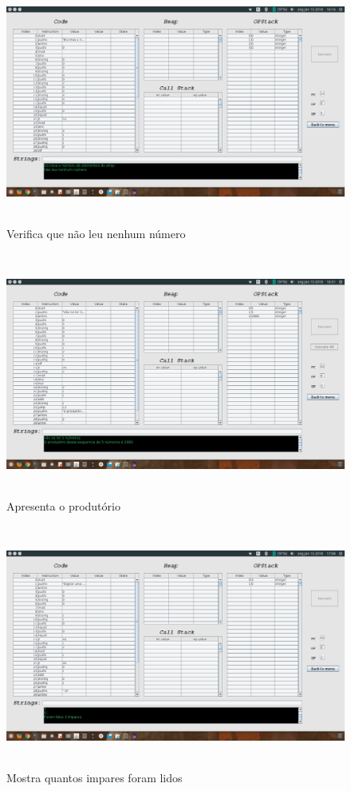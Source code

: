 \documentclass{report}
\begin{document}
\begin{figure}[h]
	\centering
	\includegraphics[width=14cm,height= 8cm]{exemplo2-2.png}
	\caption{Verifica que não leu nenhum número}
	\label{Exemplo 2.2}
\end{figure}

\begin{figure}[h]
	\centering
	\includegraphics[width=14cm,height= 8cm]{exemplo3-1.png}
	\caption{Apresenta o produtório}
	\label{Exemplo 3.1}
\end{figure}

\begin{figure}[h]
	\centering
	\includegraphics[width=14cm,height= 8cm]{exemplo4-1.png}
	\caption{Mostra quantos impares foram lidos}
	\label{Exemplo 4.1}
\end{figure}
\end{document}
